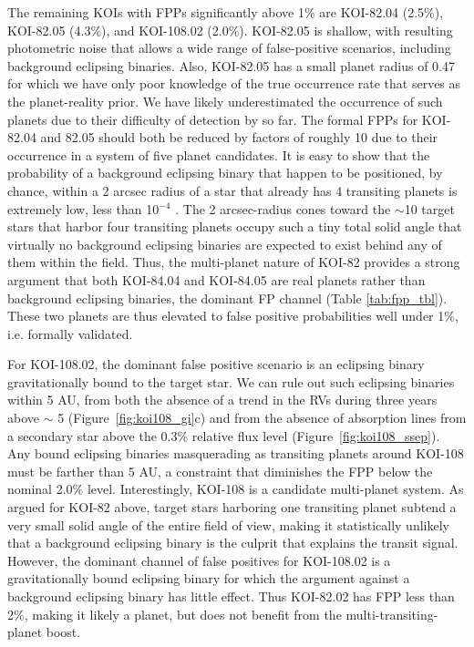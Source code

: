 \documentclass{emulateapj}
\begin{document}
The remaining KOIs with FPPs significantly above 1\% are KOI-82.04
 (2.5\%), KOI-82.05 (4.3\%), and KOI-108.02 (2.0\%).  KOI-82.05 is
 shallow, with resulting photometric noise that allows a wide range of
 false-positive scenarios, including background eclipsing binaries.
  Also, KOI-82.05 has a small planet radius of 0.47 \rearth for which
 we have only poor knowledge of the true occurrence rate that serves
 as the planet-reality prior.  We have likely underestimated the
 occurrence of such planets due to their difficulty of detection by
 \ek so far.  The formal FPPs for KOI-82.04 and 82.05 should both be
 reduced by factors of roughly 10 due to their occurrence in a system
 of five planet candidates.  It is easy to show that the probability
 of a background eclipsing binary that happen to be positioned, by
 chance, within a 2 arcsec radius of a star that already has 4
 transiting planets is extremely low, less than 10$^{-4}$
 \citep{Lissauer2012, Lissauer2013}.  The 2 arcsec-radius cones toward
 the $\sim$10 target stars that harbor four transiting planets occupy
 such a tiny total solid angle that virtually no background eclipsing
 binaries are expected to exist behind any of them within the \ek
 field.  Thus, the multi-planet nature of KOI-82 provides a strong
 argument that both KOI-84.04 and KOI-84.05 are real planets rather
 than background eclipsing binaries, the dominant FP channel 
 (Table \ref{tab:fpp_tbl}).  These two planets are thus elevated to false positive
 probabilities well under 1\%, i.e. formally validated.

For KOI-108.02, the dominant false positive scenario is an eclipsing
 binary gravitationally bound to the \ek target star.  We can rule out
 such eclipsing binaries within 5 AU, from both the absence of a trend
 in the RVs during three years above $\sim$ 5 \ms (Figure~\ref{fig:koi108_gi}c) and from
 the absence of absorption lines from a secondary star above the 0.3\%
 relative flux level (Figure~\ref{fig:koi108_ssep}).  Any bound eclipsing binaries
 masquerading as transiting planets around KOI-108 must be farther
 than 5 AU, a constraint that diminishes the FPP below the nominal
 2.0\% level.  Interestingly, KOI-108 is a candidate multi-planet
 system.  As argued for KOI-82 above, \ek target stars harboring one
 transiting planet subtend a very small solid angle of the entire \ek
 field of view, making it statistically unlikely that a background
 eclipsing binary is the culprit that explains the transit signal.
  However, the dominant channel of false positives for KOI-108.02 is a
 gravitationally bound eclipsing binary for which the argument against
 a background eclipsing binary has little effect.  Thus KOI-82.02 has
 FPP less than 2\%, making it likely a planet, but does not benefit
 from the multi-transiting-planet boost.
\end{document}
